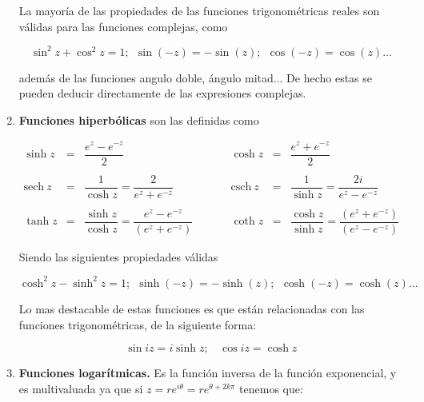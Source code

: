 \documentclass[12pt]{book}
\newcommand{\sech}{\mathrm{sech} \ }
\newcommand{\csch}{\mathrm{csch} \ }
\begin{document}
\begin{enumerate}
La mayoría de las propiedades de las funciones trigonométricas reales son válidas para las funciones complejas, como

\begin{equation}
\sin^2 z + \cos^2 z = 1; \ \ \sin(-z) = - \sin(z); \ \ \cos (-z) = \cos (z) \ldots
\end{equation}

además de las funciones angulo doble, ángulo mitad... De hecho estas se pueden deducir directamente de las expresiones complejas.


\item  \textbf{Funciones hiperbólicas} son las definidas como


\begin{equation}
\begin{array}{cclccclc}

\sinh z & = & \dfrac{e^{z}-e^{-z}}{2} & \ \ \ \ \ \ \ \ & \cosh z & = & \dfrac{e^{z} + e^{-z}}{2} \\ \\

\sech z & = & \dfrac{1}{\cosh z} = \dfrac{2}{e^{z}+e^{-z}} & \ & \csch z& = & \dfrac{1}{\sinh z} = \dfrac{2i}{e^{z}-e^{-z}} \\ \\

\tanh z & = & \dfrac{\sinh z}{\cosh z} = \dfrac{e^{z}-e^{-z} }{ (e^{z}+e^{-z})} & & \coth z & = & \dfrac{\cosh z}{\sinh z} = \dfrac{(e^{z}+e^{-z})}{(e^{z}-e^{-z})} 

\end{array}
\end{equation}

Siendo las siguientes propiedades válidas

\begin{equation}
\cosh^2 z - \sinh^2 z = 1; \ \ \sinh (-z) = - \sinh (z); \ \ \cosh (-z) = \cosh (z) \ldots
\end{equation}


Lo mas destacable de estas funciones es que están relacionadas con las funciones trigonométricas, de la siguiente forma:

\begin{equation}
\sin iz = i \sinh z; \ \ \ \ \cos iz = \cosh z
\end{equation}

\item \textbf{Funciones logarítmicas.} Es la función inversa de la función exponencial, y es multivaluada ya que si $z = r e^{i \theta} = r e^{\theta + 2k \pi}$ tenemos que:


\end{enumerate}
\end{document}
